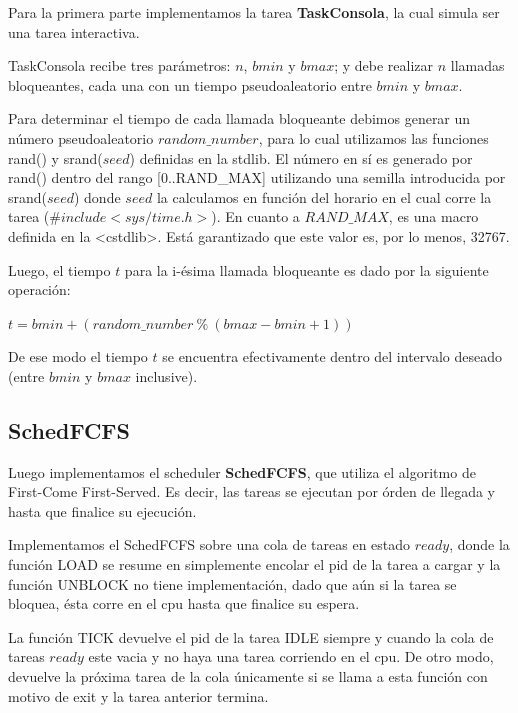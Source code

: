 Para la primera parte implementamos la tarea \textbf{TaskConsola}, la cual simula ser una tarea interactiva.

TaskConsola recibe tres parámetros: $n$, $bmin$ y $bmax$; y debe realizar $n$ llamadas bloqueantes, cada una con un tiempo pseudoaleatorio entre $bmin$ y $bmax$. 

Para determinar el tiempo de cada llamada bloqueante debimos generar un número pseudoaleatorio $random\_number$, para lo cual utilizamos las funciones rand() y srand($seed$) definidas en la stdlib. El número en sí es generado por rand() dentro del rango [0..RAND\_MAX] utilizando una semilla introducida por srand($seed$) donde $seed$ la calculamos en función del horario en el cual corre la tarea ($\#include <sys/time.h>$). 
En cuanto a $RAND\_MAX$, es una macro definida en la <cstdlib>. Está garantizado que este valor es, por lo menos, 32767.

Luego, el tiempo $t$ para la i-ésima llamada bloqueante es dado por la siguiente operación:

\begin{center}
	$t = bmin + (random\_number \ \% \ (bmax-bmin+1))$
\end{center}

%

De ese modo el tiempo $t$ se encuentra efectivamente dentro del intervalo deseado (entre $bmin$ y $bmax$ inclusive).

\subsection{SchedFCFS}

Luego implementamos el scheduler \textbf{SchedFCFS}, que utiliza el algoritmo de First-Come First-Served. Es decir, las tareas se ejecutan por órden de llegada y hasta que finalice su ejecución. 

Implementamos el SchedFCFS sobre una cola de tareas en estado $ready$, donde la función LOAD se resume en simplemente encolar el pid de la tarea a cargar y la función UNBLOCK no tiene implementación, dado que aún si la tarea se bloquea, ésta corre en el cpu hasta que finalice su espera.

La función TICK devuelve el pid de la tarea IDLE siempre y cuando la cola de tareas $ready$ este vacia y no haya una tarea corriendo en el cpu. De otro modo, devuelve la próxima tarea de la cola únicamente si se llama a esta función con motivo de exit y la tarea anterior termina.

